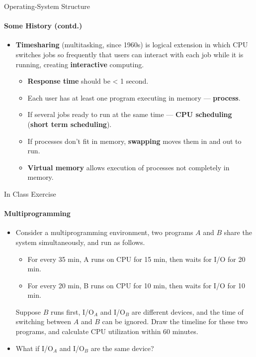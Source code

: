 \documentclass[10pt]{beamer}
\begin{document}
\begin{frame}{Operating-System Structure}
\framesubtitle{Some History (contd.)}
\begin{itemize}
\item \textbf{\alert{Timesharing}} (multitasking, since 1960s) is logical extension in which CPU switches jobs so frequently that users can interact with each job while it is running, creating \textbf{interactive} computing.
\begin{itemize}
\item \textbf{Response time} should be < 1 second.
\item Each user has at least one program executing in memory --- \textbf{process}.
\item If several jobs ready to run at the same time --- \textbf{\alert{CPU scheduling}} (\textbf{\alert{short term scheduling}}).
\item If processes don't fit in memory, \textbf{swapping} moves them in and out to run.
\item \textbf{Virtual memory} allows execution of processes not completely in memory.
\end{itemize}
\end{itemize}
\end{frame}

\begin{frame}{In Class Exercise}
\framesubtitle{Multiprogramming}
\footnotesize
\begin{itemize}
\item Consider a multiprogramming environment, two programs $A$ and $B$ share the system simultaneously, and run as follows. 
\begin{itemize}
    \item For every 35 min, A runs on CPU for 15 min, then waits for I/O for 20 min.
    \item For every 20 min, B runs on CPU for 10 min, then waits for I/O for 10 min.
\end{itemize}
Suppose $B$ runs first, I/O$_A$ and I/O$_B$ are different devices, and the time of switching between $A$ and $B$ can be ignored. Draw the timeline for these two programs, and calculate CPU utilization within 60 minutes. 
\item What if I/O$_A$ and I/O$_B$ are the same device?
\end{itemize}
\end{frame}
\end{document}
